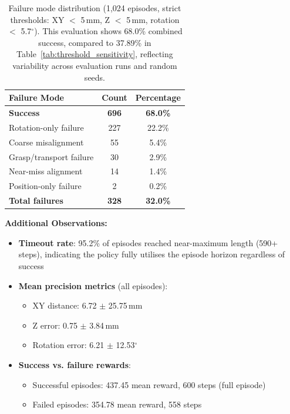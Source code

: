 \documentclass[12pt,a4paper,oneside]{report}
\begin{document}
\begin{table}[h]
\centering
\begin{tabular}{|l|c|c|}
\hline
\textbf{Failure Mode} & \textbf{Count} & \textbf{Percentage} \\
\hline
\textbf{Success} & \textbf{696} & \textbf{68.0\%} \\
\hline
Rotation-only failure & 227 & 22.2\% \\
Coarse misalignment & 55 & 5.4\% \\
Grasp/transport failure & 30 & 2.9\% \\
Near-miss alignment & 14 & 1.4\% \\
Position-only failure & 2 & 0.2\% \\
\hline
\textbf{Total failures} & \textbf{328} & \textbf{32.0\%} \\
\hline
\end{tabular}
\caption{Failure mode distribution (1{,}024 episodes, strict thresholds: XY $<$ 5\,mm, Z $<$ 5\,mm, rotation $<$ 5.7$^\circ$). This evaluation shows 68.0\% combined success, compared to 37.89\% in Table~\ref{tab:threshold_sensitivity}, reflecting variability across evaluation runs and random seeds.}
\label{tab:failure_modes}
\end{table}

\textbf{Additional Observations:}
\begin{itemize}
    \item \textbf{Timeout rate}: 95.2\% of episodes reached near-maximum length (590+ steps), indicating the policy fully utilises the episode horizon regardless of success
    \item \textbf{Mean precision metrics} (all episodes):
    \begin{itemize}
        \item XY distance: 6.72 $\pm$ 25.75\,mm
        \item Z error: 0.75 $\pm$ 3.84\,mm
        \item Rotation error: 6.21 $\pm$ 12.53$^\circ$
    \end{itemize}
    \item \textbf{Success vs. failure rewards}:
    \begin{itemize}
        \item Successful episodes: 437.45 mean reward, 600 steps (full episode)
        \item Failed episodes: 354.78 mean reward, 558 steps
    \end{itemize}
\end{itemize}
\end{document}

